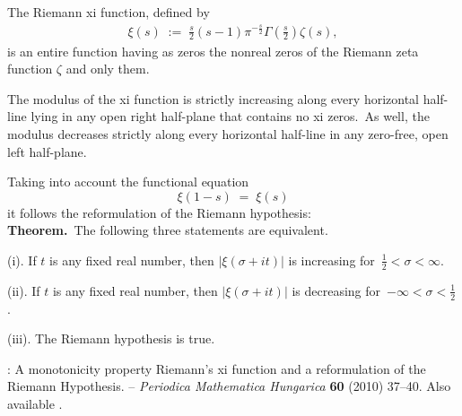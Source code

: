 \documentclass[12pt]{article}
\theoremstyle{definition}
\begin{document}
The Riemann xi function, defined by 
\begin{align*}
\xi(s) \;:=\; \frac{s}{2}(s\!-\!1)\pi^{-\frac{s}{2}}\Gamma\!\left(\frac{s}{2}\right)\zeta(s),
\end{align*}
is an entire function having as zeros the nonreal zeros of the Riemann zeta function $\zeta$ and only them.

The modulus of the xi function is strictly increasing along every horizontal half-line lying
in any open right half-plane that contains no xi zeros.\, As well, the modulus decreases strictly along
every horizontal half-line in any zero-free, open left half-plane.

Taking into account the functional equation
$$\xi(1\!-\!s) \;=\; \xi(s)$$
it follows the reformulation of the Riemann hypothesis:\\

\textbf{Theorem.}\, The following three statements are equivalent.

(i). If $t$ is any fixed real number, then $|\xi(\sigma\!+\!it)|$ is increasing for\, $\frac{1}{2} < \sigma < \infty$.

(ii). If $t$ is any fixed real number, then $|\xi(\sigma\!+\!it)|$ is decreasing for\, $-\infty < \sigma < \frac{1}{2}$.

(iii). The Riemann hypothesis is true.

\begin{thebibliography}{8}
: A monotonicity property Riemann's xi function and a reformulation of the Riemann Hypothesis. -- {\it Periodica Mathematica Hungarica} \textbf{60} (2010) 37--40.  Also available .
\end{thebibliography}

\end{document}

